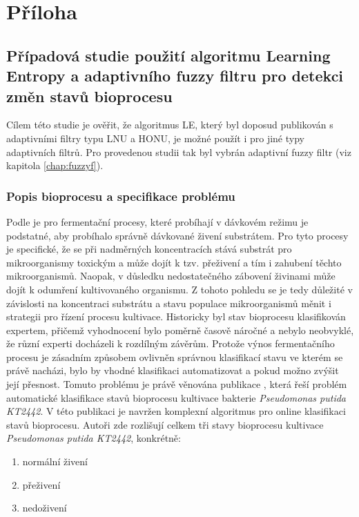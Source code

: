 \documentclass[11pt,twoside,openright]{report}
\begin{document}
\chapter*{Příloha}
\begin{appendices}
\section{Případová studie použití algoritmu Learning Entropy a adaptivního fuzzy filtru pro detekci změn stavů bioprocesu} \label{chap:LE_fuzzy}
Cílem této studie je ověřit, že algoritmus LE, který byl doposud publikován s adaptivními filtry typu LNU a HONU, je možné použít i pro jiné typy adaptivních filtrů. Pro provedenou studii tak byl vybrán adaptivní fuzzy filtr (viz kapitola \ref{chap:fuzzyf}).
\subsection{Popis bioprocesu a specifikace problému}
Podle \cite{fermentace} je pro fermentační procesy, které probíhají v dávkovém režimu je podstatné, aby probíhalo správně dávkované živení substrátem. Pro tyto procesy je specifické, že se při nadměrných koncentracích stává substrát pro mikroorganismy toxickým a může dojít k tzv. přeživení a tím i zahubení těchto mikroorganismů. Naopak, v důsledku nedostatečného zábovení živinami může dojít k odumření kultivovaného organismu. Z tohoto pohledu se je tedy důležité v závislosti na koncentraci substrátu a stavu populace mikroorganismů měnit i strategii pro řízení procesu kultivace. Historicky byl stav bioprocesu klasifikován expertem, přičemž vyhodnocení bylo poměrně časově náročné a nebylo neobvyklé, že různí experti docházeli k rozdílným závěrům. Protože výnos fermentačního procesu je zásadním způsobem ovlivněn správnou klasifikací stavu ve kterém se právě nacházi, bylo by vhodné klasifikaci automatizovat a pokud možno zvýšit její přesnost. Tomuto problému je právě věnována publikace \cite{fermentace}, která řeší problém automatické klasifikace stavů bioprocesu kultivace bakterie \textit{Pseudomonas putida KT2442}. V této publikaci je navržen komplexní algoritmus pro online klasifikaci stavů bioprocesu. Autoři zde rozlišují celkem tři stavy bioprocesu kultivace \textit{Pseudomonas putida KT2442}, konkrétně:
\begin{enumerate}
    \item normální živení
    \item přeživení
    \item nedoživení

\end{enumerate}
\end{appendices}
\end{document}
